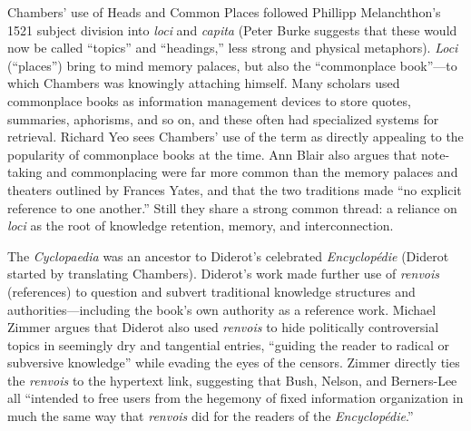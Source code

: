 Chambers' use of Heads and Common Places followed Phillipp Melanchthon's 1521 subject division into \emph{loci} and \emph{capita} (Peter Burke suggests that these would now be called ``topics'' and ``headings,'' less strong and physical metaphors).\autocite[95]{burke_social_2000} \emph{Loci} (``places'') bring to mind memory palaces, but also the ``commonplace book''---to which Chambers was knowingly attaching himself. Many scholars used commonplace books as information management devices to store quotes, summaries, aphorisms, and so on, and these often had specialized systems for retrieval. Richard Yeo sees Chambers' use of the term as directly appealing to the popularity of commonplace books at the time.\autocite[65-66]{yeo_solution_2003} Ann Blair also argues that note-taking and commonplacing were far more common than the memory palaces and theaters outlined by Frances Yates, and that the two traditions made ``no explicit reference to one another.''\autocite[``Note Taking as an Aid to Memory'']{blair_too_2010} Still they share a strong common thread: a reliance on \emph{loci} as the root of knowledge retention, memory, and interconnection.

The \emph{Cyclopaedia} was an ancestor to Diderot's celebrated \emph{Encyclop\'{e}die} (Diderot started by translating Chambers). Diderot's work made further use of \emph{renvois} (references) to question and subvert traditional knowledge structures and authorities---including the book's own authority as a reference work. Michael Zimmer argues that Diderot also used \emph{renvois} to hide politically controversial topics in seemingly dry and tangential entries, ``guiding the reader to radical or subversive knowledge'' while evading the eyes of the censors.\autocite[103]{zimmer_renvois_2009} Zimmer directly ties the \emph{renvois} to the hypertext link, suggesting that Bush, Nelson, and Berners-Lee all ``intended to free users from the hegemony of fixed information organization in much the same way that \emph{renvois} did for the readers of the \emph{Encyclop\'{e}die}.''\autocite[104]{zimmer_renvois_2009}

